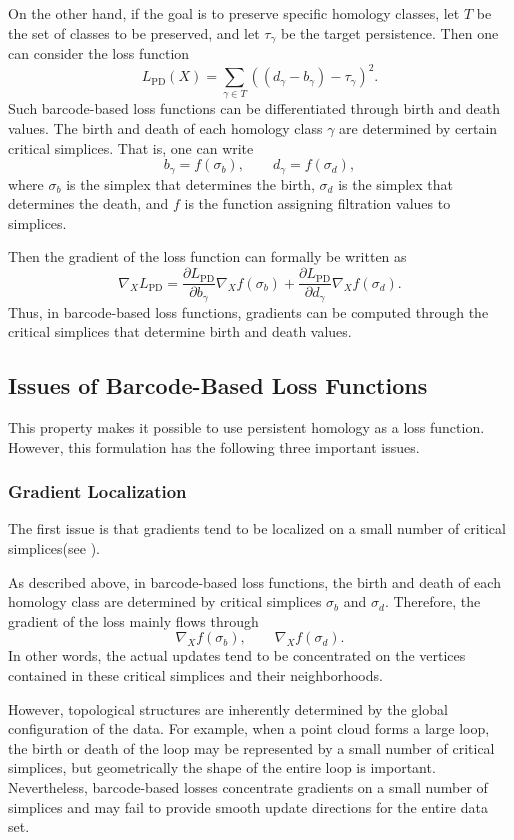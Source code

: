 \documentclass[pdflatex,sn-mathphys-ay]{sn-jnl}%
\theoremstyle{thmstyleone}%
\theoremstyle{thmstyletwo}%
\theoremstyle{thmstylethree}%
\begin{document}
On the other hand, if the goal is to preserve specific homology classes, let \(T\) be the set of classes to be preserved, and let \(\tau_{\gamma}\) be the target persistence.
Then one can consider the loss function
\[
L_{\mathrm{PD}}(X)
=
\sum_{\gamma\in T}
\left(
(d_{\gamma}-b_{\gamma})-\tau_{\gamma}
\right)^2.
\]
Such barcode-based loss functions can be differentiated through birth and death values.
The birth and death of each homology class \(\gamma\) are determined by certain critical simplices.
That is, one can write
\[
b_{\gamma}=f(\sigma_b),
\qquad
d_{\gamma}=f(\sigma_d),
\]
where \(\sigma_b\) is the simplex that determines the birth, \(\sigma_d\) is the simplex that determines the death, and \(f\) is the function assigning filtration values to simplices.

Then the gradient of the loss function can formally be written as
\[
\nabla_X L_{\mathrm{PD}}
=
\frac{\partial L_{\mathrm{PD}}}{\partial b_{\gamma}}
\nabla_X f(\sigma_b)
+
\frac{\partial L_{\mathrm{PD}}}{\partial d_{\gamma}}
\nabla_X f(\sigma_d).
\]
Thus, in barcode-based loss functions, gradients can be computed through the critical simplices that determine birth and death values.

\subsection{Issues of Barcode-Based Loss Functions}

This property makes it possible to use persistent homology as a loss function.
However, this formulation has the following three important issues.

\subsubsection{Gradient Localization}

The first issue is that gradients tend to be localized on a small number of critical simplices(see \cite{nigmetov2024topological,nigmetov2024topological_2}).

As described above, in barcode-based loss functions, the birth and death of each homology class are determined by critical simplices \(\sigma_b\) and \(\sigma_d\).
Therefore, the gradient of the loss mainly flows through
\[
\nabla_X f(\sigma_b),
\qquad
\nabla_X f(\sigma_d).
\]
In other words, the actual updates tend to be concentrated on the vertices contained in these critical simplices and their neighborhoods.

However, topological structures are inherently determined by the global configuration of the data.
For example, when a point cloud forms a large loop, the birth or death of the loop may be represented by a small number of critical simplices, but geometrically the shape of the entire loop is important.
Nevertheless, barcode-based losses concentrate gradients on a small number of simplices and may fail to provide smooth update directions for the entire data set.
\end{document}
